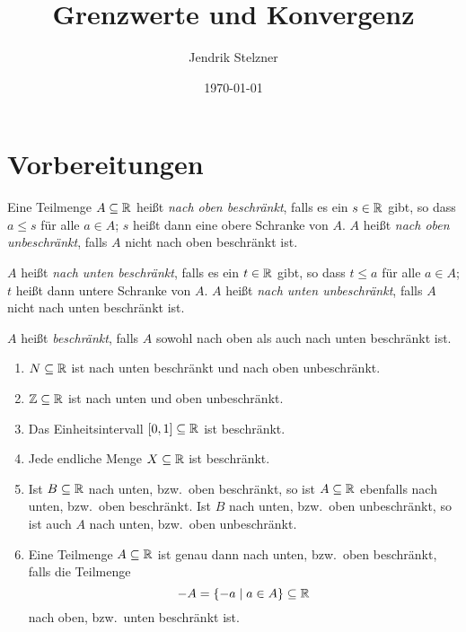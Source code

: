 \documentclass[a4paper,10pt]{article}
\title{Grenzwerte und Konvergenz}
\author{Jendrik Stelzner}
\date{\today}
\begin{document}
\maketitle

\tableofcontents





\section{Vorbereitungen}


\begin{defi}
 Eine Teilmenge $A \subseteq \mathbb{R}$ heißt \emph{nach oben beschränkt}, falls es ein $s \in \mathbb{R}$ gibt, so dass $a \leq s$ für alle $a \in A$; $s$ heißt dann eine obere Schranke von $A$. $A$ heißt \emph{nach oben unbeschränkt}, falls $A$ nicht nach oben beschränkt ist.
 
 $A$ heißt \emph{nach unten beschränkt}, falls es ein $t \in \mathbb{R}$ gibt, so dass $t \leq a$ für alle $a \in A$; $t$ heißt dann untere Schranke von $A$. $A$ heißt \emph{nach unten unbeschränkt}, falls $A$ nicht nach unten beschränkt ist.
 
 $A$ heißt \emph{beschränkt}, falls $A$ sowohl nach oben als auch nach unten beschränkt ist.
\end{defi}


\begin{bsp}
 \begin{enumerate}
  \item
   $N \subseteq \mathbb{R}$ ist nach unten beschränkt und nach oben unbeschränkt.
  \item
   $\mathbb{Z} \subseteq \mathbb{R}$ ist nach unten und oben unbeschränkt.
  \item
   Das Einheitsintervall $[0,1] \subseteq \mathbb{R}$ ist beschränkt.
  \item
   Jede endliche Menge $X \subseteq \mathbb{R}$ ist beschränkt.
  \item
   Ist $B \subseteq \mathbb{R}$ nach unten, bzw.\ oben beschränkt, so ist $A \subseteq \mathbb{R}$ ebenfalls nach unten, bzw.\ oben beschränkt. Ist $B$ nach unten, bzw.\ oben unbeschränkt, so ist auch $A$ nach unten, bzw.\ oben unbeschränkt.
  \item
   Eine Teilmenge $A \subseteq \mathbb{R}$ ist genau dann nach unten, bzw.\ oben beschränkt, falls die Teilmenge
   \[
    -A = \{-a \mid a \in A\} \subseteq \mathbb{R}
   \]
   nach oben, bzw.\ unten beschränkt ist.
 \end{enumerate}
\end{bsp}
\end{document}
